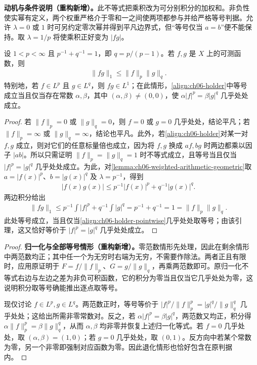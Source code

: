 \documentclass[../../main.tex]{subfiles}
\begin{document}
\begin{remark}
\textbf{动机与条件说明（重构新增）。}此不等式把乘积改为可分别积分的加权和。非负性使实幂有定义，两个权重严格介于零和一之间使两项都参与并给严格等号判据。允许 $\lambda=0$ 或 $1$ 时可另约定零次幂并得到平凡边界式，但“等号仅当 $a=b$”便不能保持。取 $\lambda=1/p$ 将使乘积正好变为 $|fg|$。
\end{remark}
\begin{theorem}\label{theorem:ch06-holder}
设 $1<p<\infty$ 且 $p^{-1}+q^{-1}=1$，即 $q=p/(p-1)$。若 $f,g$ 是 $X$ 上的可测函数，则
\begin{align}
\|fg\|_1\leqslant\|f\|_p\|g\|_q.\label{align:ch06-holder}
\end{align}
特别地，若 $f\in L^p$ 且 $g\in L^q$，则 $fg\in L^1$；在此情形，\eqref{align:ch06-holder}中等号成立当且仅当存在常数 $\alpha,\beta$，其中 $(\alpha,\beta)\ne(0,0)$，使 $\alpha|f|^p=\beta|g|^q$ 几乎处处成立。
\end{theorem}
\begin{proof}
若 $\|f\|_p=0$ 或 $\|g\|_q=0$，则 $f=0$ 或 $g=0$ 几乎处处，结论平凡；若 $\|f\|_p=\infty$ 或 $\|g\|_q=\infty$，结论也平凡。此外，若\eqref{align:ch06-holder}对某一对 $f,g$ 成立，则对它们的任意标量倍也成立，因为将 $f,g$ 换成 $af,bg$ 时两边都乘以因子 $|ab|$。所以只需证明 $\|f\|_p=\|g\|_q=1$ 时不等式成立，且等号当且仅当 $|f|^p=|g|^q$ 几乎处处成立。为此，对\cref{lemma:ch06-weighted-arithmetic-geometric}取 $a=|f(x)|^p$、$b=|g(x)|^q$ 及 $\lambda=p^{-1}$，得到
\begin{align}
|f(x)g(x)|\leqslant p^{-1}|f(x)|^p+q^{-1}|g(x)|^q.\label{align:ch06-holder-pointwise}
\end{align}
两边积分给出
\begin{align*}
\|fg\|_1\leqslant p^{-1}\int|f|^p+q^{-1}\int|g|^q
=p^{-1}+q^{-1}=1=\|f\|_p\|g\|_q.
\end{align*}
此处等号成立，当且仅当\eqref{align:ch06-holder-pointwise}几乎处处取等号；由该引理，这又恰好等价于 $|f|^p=|g|^q$ 几乎处处成立。
\end{proof}
\begin{proof}
\textbf{归一化与全部等号情形（重构新增）。}零范数情形先处理，因此在剩余情形中两范数均正；其中任一个为无穷时右端为无穷，不需要作除法。两者正且有限时，应用原证明于 $F=f/\|f\|_p$、$G=g/\|g\|_q$，再乘两范数即可。原归一化不等式右边与左边之差为非负可积函数，它的积分为零当且仅当它几乎处处为零，这说明积分取等号确能推出逐点取等号。

现仅讨论 $f\in L^p,g\in L^q$。两范数正时，等号等价于 $|f|^p/\|f\|_p^p=|g|^q/\|g\|_q^q$ 几乎处处；这给出所需非零常数对。反之，若 $\alpha|f|^p=\beta|g|^q$，两范数又均正，积分得 $\alpha\|f\|_p^p=\beta\|g\|_q^q$，从而 $\alpha,\beta$ 均非零并恢复上述归一化等式。若 $f=0$ 几乎处处，取 $(\alpha,\beta)=(1,0)$；若 $g=0$ 几乎处处，取 $(0,1)$。反方向中若某个常数为零，另一个非零即强制对应函数为零。因此退化情形也恰好包含在原判据内。
\end{proof}
\end{document}
